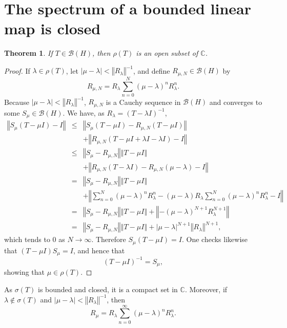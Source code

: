 \documentclass{article}
\newcommand{\norm}[1]{\left\Vert #1 \right\Vert}
\newtheorem{theorem}{Theorem}
\begin{document}
\section{The spectrum of a bounded linear map is closed}
\begin{theorem}
If $T \in \mathscr{B}(H)$, then $\rho(T)$ is an open subset of $\mathbb{C}$.
\end{theorem}
\begin{proof}
 If $\lambda \in \rho(T)$, let $|\mu-\lambda| < \norm{R_\lambda}^{-1}$, and
define $R_{\mu,N} \in \mathscr{B}(H)$ by
\[
R_{\mu,N}=R_\lambda \sum_{n=0}^N (\mu-\lambda)^n R_\lambda^n.
\]
Because $|\mu-\lambda| < \norm{R_\lambda}^{-1}$, $R_{\mu,N}$ is a Cauchy sequence in $\mathscr{B}(H)$ and converges to some $S_\mu
\in \mathscr{B}(H)$. 
We have, as $R_\lambda=(T-\lambda I)^{-1}$,
\begin{eqnarray*}
\norm{S_\mu(T-\mu I)-I}&\leq&\norm{S_\mu(T-\mu I)-R_{\mu,N}(T-\mu I)}\\
&&+\norm{R_{\mu,N}(T-\mu I+ \lambda I - \lambda I)-I}\\
&\leq&\norm{S_\mu-R_{\mu,N}} \norm{T-\mu   I}\\
&& + \norm{R_{\mu,N}(T-\lambda   I) - R_{\mu,N}(\mu-\lambda)  -  I}\\
&=&\norm{S_\mu-R_{\mu,N}} \norm{T-\mu I} \\
&&+\norm{\sum_{n=0}^N ( \mu-\lambda)^n R_\lambda ^n - (\mu - \lambda)R_\lambda \sum_{n=0}^N (\mu-\lambda)^n R_\lambda ^n - I}\\
&=&\norm{S_\mu-R_{\mu,N}} \norm{T-\mu I} + \norm{- (\mu - \lambda)^{N+1} R_\lambda^{N+1}}\\
&=&\norm{S_\mu-R_{\mu,N}} \norm{T-\mu I} + |\mu-\lambda|^{N+1} \norm{R_\lambda}^{N+1},
\end{eqnarray*}
which tends to $0$ as $N \to \infty$. Therefore $S_\mu(T-\mu I)=I$. One checks likewise that $(T-\mu I) S_\mu  = I$, and hence that
\[
(T-\mu I)^{-1} = S_\mu,
\]
showing that $\mu \in \rho(T)$.
\end{proof}

 As $\sigma(T)$ is bounded and closed, it is a compact
set in $\mathbb{C}$. Moreover, if $\lambda \not \in \sigma(T)$ and $|\mu-\lambda| < \norm{R_\lambda}^{-1}$, then
\[
R_\mu = R_\lambda \sum_{n=0}^\infty (\mu-\lambda)^n R_\lambda^n.
\]
\end{document}
